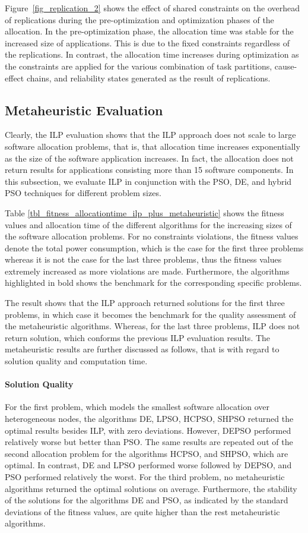 Figure~\ref{fig_replication_2} shows the effect of shared constraints on the overhead of replications during the pre-optimization and optimization phases of the allocation. In the pre-optimization phase, the allocation time was stable for the increased size of applications. This is due to the fixed constraints regardless of the replications. In contrast, the allocation time increases during optimization as the constraints are applied for the various combination of task partitions, cause-effect chains, and reliability states generated as the result of replications.

\subsection{Metaheuristic Evaluation}
Clearly, the ILP evaluation shows that the ILP approach does not scale to large software allocation problems, that is, that allocation time increases exponentially as the size of the software application increases. In fact, the allocation does not return results for applications consisting more than 15 software components. In this subsection, we evaluate ILP in conjunction with the PSO, DE, and hybrid PSO techniques for different problem sizes.

Table \ref{tbl_fitness_allocationtime_ilp_plus_metaheuristic} shows the fitness values and allocation time of the different algorithms for the increasing sizes of the software allocation problems. For no constraints violations, the fitness values denote the total power consumption, which is the case for the first three problems whereas it is not the case for the last three problems, thus the fitness values extremely increased as more violations are made. Furthermore, the algorithms highlighted in bold shows the benchmark for the corresponding specific problems. 

The result shows that the ILP approach returned solutions for the first three problems, in which case it becomes the benchmark for the quality assessment of the metaheuristic algorithms. Whereas, for the last three problems, ILP does not return solution, which conforms the previous ILP evaluation results. The metaheuristic results are further discussed as follows, that is with regard to solution quality and computation time.

\paragraph{Solution Quality} For the first problem, which models the smallest software allocation over heterogeneous nodes, the algorithms DE, LPSO, HCPSO, SHPSO returned the optimal results besides ILP, with zero deviations. However, DEPSO performed relatively worse but better than PSO. The same results are repeated out of the second allocation problem for the algorithms HCPSO, and SHPSO, which are optimal. In contrast, DE and LPSO performed worse followed by DEPSO, and PSO performed relatively the worst. For the third problem, no metaheuristic algorithms returned the optimal solutions on average. Furthermore, the stability of the solutions for the algorithms DE and PSO, as indicated by the standard deviations of the fitness values, are quite higher than the rest metaheuristic algorithms.

